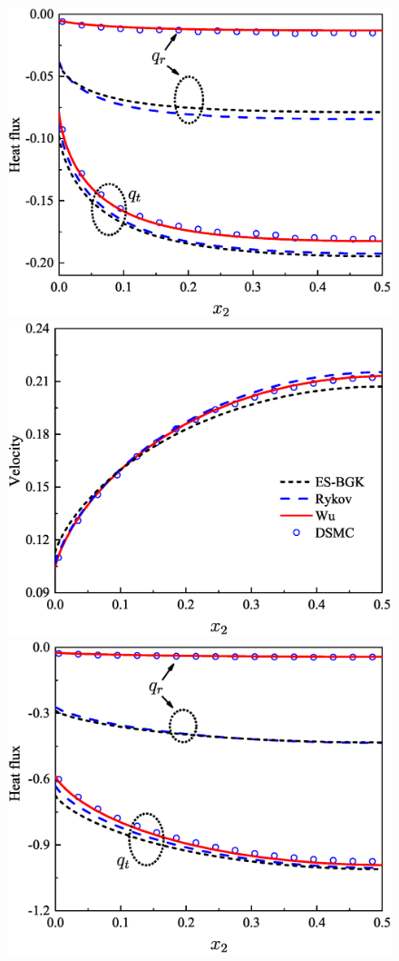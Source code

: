 \begin{figure}[t]
	{\includegraphics[scale=0.28,clip=true]{Fig/05TC1D2.eps}}\\
	\vskip 0.5cm
	{\includegraphics[scale=0.28,clip=true]{Fig/05TC1D3.eps}}\quad
	{\includegraphics[scale=0.28,clip=true]{Fig/05TC1D4.eps}}

\end{figure}
